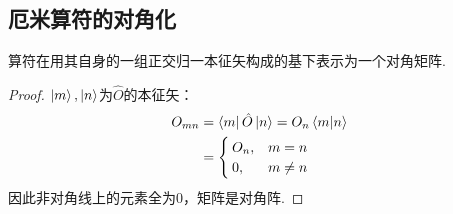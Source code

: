 \subsection{厄米算符的对角化}
\begin{theorem}
    算符在用其自身的一组正交归一本征矢构成的基下表示为一个对角矩阵.
\end{theorem}
\begin{proof}
    $\ket{m},\ket{n}$为$\hat{O}$的本征矢：
    \[
    \begin{aligned}
        O_{mn} &= \bra{m}\hat{O}\ket{n} = O_n \braket{m}{n} \\
        &=\begin{cases}
            O_n, &m=n \\
            0, &m \neq n
        \end{cases}
    \end{aligned}
    \]
    因此非对角线上的元素全为$0$，矩阵是对角阵.
\end{proof}

